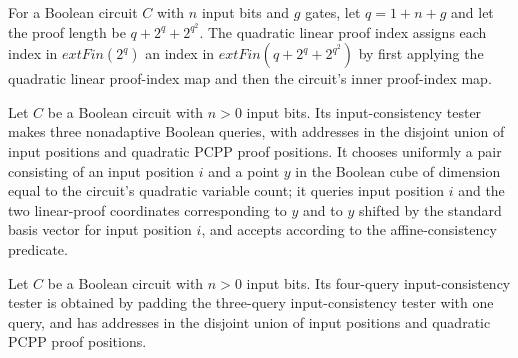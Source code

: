 \begin{definition}
\label{FABL.BooleanCircuit.circuitQuadraticLinearProofIndex}
\leanok
{}
For a Boolean circuit $C$ with $n$ input bits and $g$ gates, let $q=1+n+g$ and let the
proof length be $q+2^q+2^{q^2}$. The quadratic linear proof index assigns each index in
$	ext{Fin}(2^q)$ an index in $	ext{Fin}(q+2^q+2^{q^2})$ by first applying the quadratic
linear proof-index map and then the circuit's inner proof-index map.
\end{definition}

\begin{definition}
\label{FABL.BooleanCircuit.circuitQuadraticInputConsistencyThreeTester}
\leanok
{}
Let $C$ be a Boolean circuit with $n>0$ input bits. Its input-consistency tester makes
three nonadaptive Boolean queries, with addresses in the disjoint union of input
positions and quadratic PCPP proof positions. It chooses uniformly a pair consisting of
an input position $i$ and a point $y$ in the Boolean cube of dimension equal to the
circuit’s quadratic variable count; it queries input position $i$ and the two
linear-proof coordinates corresponding to $y$ and to $y$ shifted by the standard basis
vector for input position $i$, and accepts according to the affine-consistency
predicate.
\end{definition}

\begin{definition}
\label{FABL.BooleanCircuit.circuitQuadraticInputConsistencyFunctionTester}
\leanok
{}
Let $C$ be a Boolean circuit with $n>0$ input bits. Its four-query input-consistency
tester is obtained by padding the three-query input-consistency tester with one query,
and has addresses in the disjoint union of input positions and quadratic PCPP proof
positions.
\end{definition}

